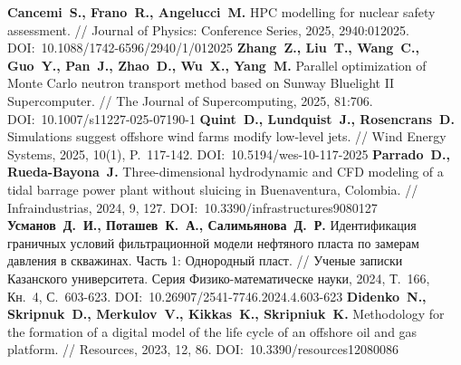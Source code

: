 \begin{thebibliography}{99}
\textbf{Cancemi~S., Frano~R., Angelucci~M.} HPC modelling for nuclear safety assessment. // Journal of Physics: Conference Series, 2025, 2940:012025. DOI:~10.1088/1742-6596/2940/1/012025
\textbf{Zhang~Z., Liu~T., Wang~C., Guo~Y., Pan~J., Zhao~D., Wu~X., Yang~M.} Parallel optimization of Monte Carlo neutron transport method based on Sunway Bluelight II Supercomputer. // The Journal of Supercomputing, 2025, 81:706. DOI:~10.1007/s11227-025-07190-1
\textbf{Quint~D., Lundquist~J., Rosencrans~D.} Simulations suggest offshore wind farms modify low-level jets. // Wind Energy Systems, 2025, 10(1), P.~117-142. DOI:~10.5194/wes-10-117-2025
\textbf{Parrado~D., Rueda-Bayona~J.} Three-dimensional hydrodynamic and CFD modeling of a tidal barrage power plant without sluicing in Buenaventura, Colombia. // Infraindustrias, 2024, 9, 127. DOI:~10.3390/infrastructures9080127
\textbf{Усманов~Д.~И., Поташев~К.~А., Салимьянова~Д.~Р.} Идентификация граничных условий фильтрационной модели нефтяного пласта по замерам давления в скважинах. Часть 1: Однородный пласт. // Ученые записки Казанского университета. Серия Физико-математическе науки, 2024, Т.~166, Кн.~4, С.~603-623. DOI:~10.26907/2541-7746.2024.4.603-623
\textbf{Didenko~N., Skripnuk~D., Merkulov~V., Kikkas~K., Skripniuk~K.} Methodology for the formation of a digital model of the life cycle of an offshore oil and gas platform. // Resources, 2023, 12, 86. DOI:~10.3390/resources12080086


\end{thebibliography}
